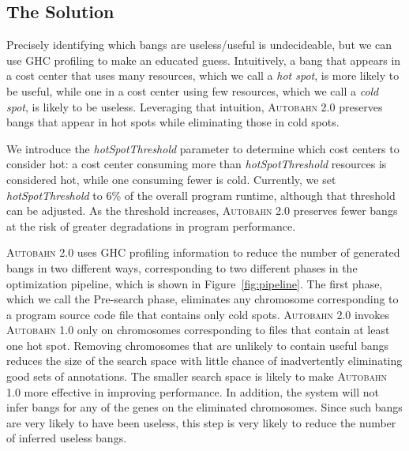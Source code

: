 \documentclass[format=sigplan, review=true, 9pt]{acmart}
\newcommand{\cut}[1]{}
\newcommand{\figref}[1]{Figure~\ref{#1}}
\newcommand{\hotspot}[0]{hot spot}
\newcommand{\hotspots}[0]{hot spots}
\newcommand{\coldspot}[0]{cold spot}
\newcommand{\coldspots}[0]{cold spots}
\newcommand{\hotspotcost}[0]{\textit{hotSpotThreshold}}
\newcommand{\useful}[0]{useful}
\newcommand{\useless}[0]{useless}
\newcommand{\Ao}[0]{\textsc{Autobahn 1.0}}
\newcommand{\At}[0]{\textsc{Autobahn 2.0}}
\newcommand{\Preopt}[0]{Pre-search}
\begin{document}
\subsection{The Solution}

Precisely identifying which bangs are \useless{}/\useful{} is undecideable, but
we can use GHC profiling to make an educated guess. 
Intuitively, a bang
that appears in a cost center that uses many resources, which we 
call a \textit{\hotspot}, is more likely to be \useful{}, while one in a
cost center using few resources, which we call a \textit{\coldspot}, is likely to
be \useless{}.  Leveraging that intuition, \At{} preserves bangs that appear
in \hotspots{} while eliminating those in \coldspots.

We introduce the \hotspotcost{} parameter to determine
which cost centers to consider hot:  a cost center consuming more
than \hotspotcost{} resources is considered hot, while
one consuming fewer is cold.  
Currently, we set \hotspotcost{} 
to 6\% of the overall program runtime, although that threshold can
be adjusted. As the threshold increases, \At{} preserves fewer bangs
at the risk of greater degradations in program performance.


\cut{
isolate portions
of a chromosome by their individual contributions to program
performance. Cost centers not only break down a chromosome into
smaller portions by source code bindings, but their associated costs
also imply how likely a bang placement will affect program
performance. If executing code at a \hotspot{} occupied a significant
portion of the overall program runtime, then a bang-induced change in
performance at the \hotspot{} will likely significantly affect overall
runtime as well. }

\At{} uses GHC profiling information to reduce the
number of generated bangs in two different ways, corresponding to two
different phases in the optimization pipeline, which is shown in \figref{fig:pipeline}.  The first phase, which
we call
the \Preopt{} phase, eliminates
any chromosome corresponding to a program source code file that
contains only \coldspots{}. \At{} invokes \Ao{} only on chromosomes
corresponding to files that contain at least one \hotspot{}.  Removing
chromosomes that are unlikely to contain \useful{} bangs reduces the
size of the search space with little chance of inadvertently
eliminating good sets of annotations.  The smaller search space is
likely to make \Ao{} more effective in improving performance.  In
addition, the system will not infer bangs for any of the genes on the
eliminated chromosomes.  Since such bangs are very likely to have
been \useless{}, this step is very likely to reduce the number of
inferred \useless{} bangs.
\end{document}
